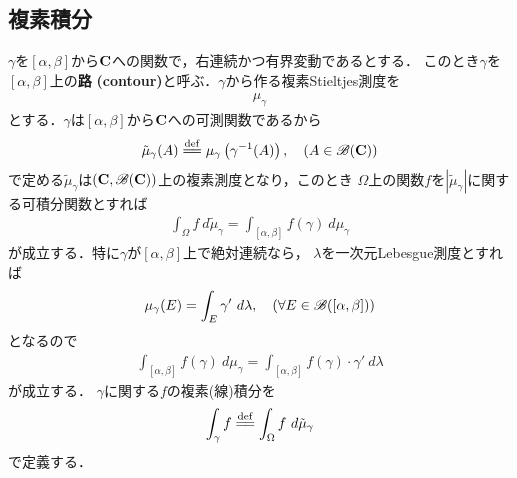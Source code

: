 \subsection{複素積分}
	$\gamma$を$[\alpha,\beta]$から$\mathbf{C}$への関数で，右連続かつ有界変動であるとする．
	このとき$\gamma$を$[\alpha,\beta]$上の{\bf 路}
	{\bf (contour)}と呼ぶ．$\gamma$から作る複素Stieltjes測度を
	\begin{align}
		\mu_\gamma
	\end{align}
	とする．$\gamma$は$[\alpha,\beta]$から$\mathbf{C}$への可測関数であるから
	\begin{align}
		\tilde{\mu}_\gamma(A) \defeq \mu_\gamma\left( \gamma^{-1}(A) \right),
		\quad (A \in \borel{\C})
	\end{align}
	で定める$\tilde{\mu}_\gamma$は$(\mathbf{C},\mathscr{B}(\mathbf{C}))$上の複素測度となり，このとき
	$\Omega$上の関数$f$を$|\tilde{\mu}_\gamma|$に関する可積分関数とすれば
	\begin{align}
		\int_\Omega f\ d\tilde{\mu}_\gamma = \int_{[\alpha,\beta]} f(\gamma)\ d\mu_\gamma
	\end{align}
	が成立する．特に$\gamma$が$[\alpha,\beta]$上で絶対連続なら，
	$\lambda$を一次元Lebesgue測度とすれば
	\begin{align}
		\mu_\gamma(E) = \int_E \gamma'\ d\lambda,
		\quad (\forall E \in \mathscr{B}([\alpha,\beta]))
	\end{align}
	となるので
	\begin{align}
		\int_{[\alpha,\beta]} f(\gamma)\ d\mu_\gamma = \int_{[\alpha,\beta]} f(\gamma) \cdot \gamma'\ d\lambda
	\end{align}
	が成立する．
	$\gamma$に関する$f$の複素(線)積分を
	\begin{align}
		\int_\gamma f \defeq \int_\Omega f\ d\tilde{\mu}_\gamma
	\end{align}
	で定義する．
	
